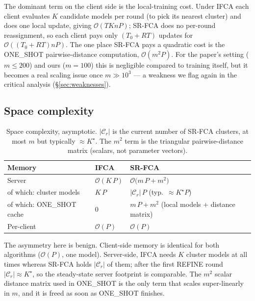The dominant term on the client side is the local-training cost. Under IFCA each client evaluates $K$ candidate models per round (to pick its nearest cluster) and does one local update, giving $\mathcal{O}(T K n P)$; SR-FCA does no per-round reassignment, so each client pays only $(T_0 + R T)$ updates for $\mathcal{O}((T_0 + R T) n P)$. The one place SR-FCA pays a quadratic cost is the ONE\_SHOT pairwise-distance computation, $\mathcal{O}(m^2 P)$. For the paper's setting ($m \le 200$) and ours ($m = 100$) this is negligible compared to training itself, but it becomes a real scaling issue once $m \gg 10^3$ --- a weakness we flag again in the critical analysis (\S\ref{sec:weaknesses}).

\subsection{Space complexity}\label{sec:space-complexity}

\begin{table}[h]
\centering
\small
\begin{tabular}{lll}
\toprule
Memory & IFCA & SR-FCA \\
\midrule
Server                          & $\mathcal{O}(K\,P)$  & $\mathcal{O}\bigl(m\,P + m^2\bigr)$ \\
\quad of which: cluster models  & $K\,P$               & $|\mathcal{C}_r|\,P$ (typ.\ $\approx K^\star P$) \\
\quad of which: ONE\_SHOT cache & $0$                  & $m\,P + m^2$ (local models + distance matrix) \\
Per-client                      & $\mathcal{O}(P)$     & $\mathcal{O}(P)$ \\
\bottomrule
\end{tabular}
\caption{Space complexity, asymptotic. $|\mathcal{C}_r|$ is the current number of SR-FCA clusters, at most $m$ but typically $\approx K^\star$. The $m^2$ term is the triangular pairwise-distance matrix (scalars, not parameter vectors).}\label{tab:complexity-space}
\end{table}

The asymmetry here is benign. Client-side memory is identical for both algorithms ($\mathcal{O}(P)$, one model). Server-side, IFCA needs $K$ cluster models at all times whereas SR-FCA holds $|\mathcal{C}_r|$ of them; after the first REFINE round $|\mathcal{C}_r| \approx K^\star$, so the steady-state server footprint is comparable. The $m^2$ scalar distance matrix used in ONE\_SHOT is the only term that scales super-linearly in $m$, and it is freed as soon as ONE\_SHOT finishes.

